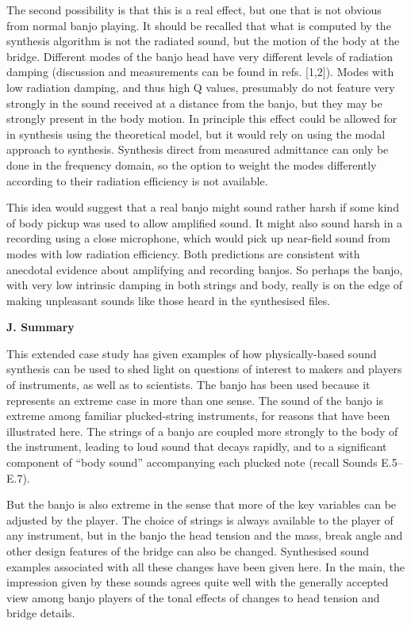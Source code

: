   The second possibility is that this is a real effect, but one that is not 
  obvious from normal banjo playing. It should be recalled that what is 
  computed by the synthesis algorithm is not the radiated sound, but the motion 
  of the body at the bridge. Different modes of the banjo head have very 
  different levels of radiation damping (discussion and measurements can be 
  found in refs. [1,2]). Modes with low radiation damping, and thus high Q 
  values, presumably do not feature very strongly in the sound received at a 
  distance from the banjo, but they may be strongly present in the body motion. 
  In principle this effect could be allowed for in synthesis using the 
  theoretical model, but it would rely on using the modal approach to 
  synthesis. Synthesis direct from measured admittance can only be done in the 
  frequency domain, so the option to weight the modes differently according to 
  their radiation efficiency is not available. 

  This idea would suggest that a real banjo might sound rather harsh if some 
  kind of body pickup was used to allow amplified sound. It might also sound 
  harsh in a recording using a close microphone, which would pick up near-field 
  sound from modes with low radiation efficiency. Both predictions are 
  consistent with anecdotal evidence about amplifying and recording banjos. So 
  perhaps the banjo, with very low intrinsic damping in both strings and body, 
  really is on the edge of making unpleasant sounds like those heard in the 
  synthesised files. 

  \textbf{J. Summary} 

  This extended case study has given examples of how physically-based sound 
  synthesis can be used to shed light on questions of interest to makers and 
  players of instruments, as well as to scientists. The banjo has been used 
  because it represents an extreme case in more than one sense. The sound of 
  the banjo is extreme among familiar plucked-string instruments, for reasons 
  that have been illustrated here. The strings of a banjo are coupled more 
  strongly to the body of the instrument, leading to loud sound that decays 
  rapidly, and to a significant component of ``body sound'' accompanying each 
  plucked note (recall Sounds E.5--E.7). 

  But the banjo is also extreme in the sense that more of the key variables can 
  be adjusted by the player. The choice of strings is always available to the 
  player of any instrument, but in the banjo the head tension and the mass, 
  break angle and other design features of the bridge can also be changed. 
  Synthesised sound examples associated with all these changes have been given 
  here. In the main, the impression given by these sounds agrees quite well 
  with the generally accepted view among banjo players of the tonal effects of 
  changes to head tension and bridge details. 

